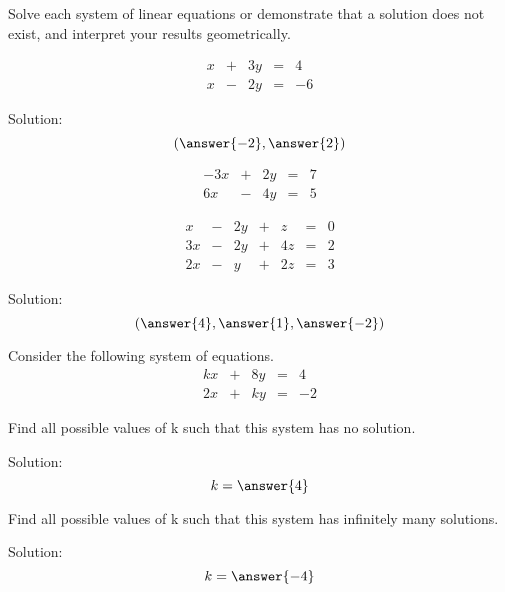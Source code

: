 \documentclass{ximera}
\begin{document}
\begin{problem} 
Solve each system of linear equations or demonstrate that a solution does not exist, and interpret your results geometrically.
  \begin{problem}\label{prob:solvesys1}
  $$\begin{array}{ccccc}
      x & +&3y&= &4 \\
	 x& -&2y&=&-6
    \end{array}$$
    
    Solution: $$(\answer{-2},\answer{2})$$
  \end{problem}
  
  \begin{problem}\label{prob:solvesys2}
  $$\begin{array}{ccccc}
      -3x & +&2y&= &7 \\
	 6x& -&4y&=&5
    \end{array}$$
  \end{problem}
  
  
  \begin{problem}\label{prob:solvesys3}
$$\begin{array}{ccccccc}
      x & -&2y&+&z&= &0 \\
	 3x& -&2y&+&4z&=&2\\
     2x& -&y&+&2z&=&3
    \end{array}$$
    
Solution:    $$(\answer{4},\answer{1},\answer{-2})$$
\end{problem}
\end{problem}

  \begin{problem}
  Consider the following system of equations.
  $$\begin{array}{ccccc}
      kx & +&8y&= &4 \\
	 2x& +&ky&=&-2
    \end{array}$$
     \begin{problem}\label{prob:sysnosolfindk}
Find all possible values of k such that this system has no solution.

Solution: $$k=\answer{4}$$
  \end{problem}
     \begin{problem}\label{prob:sysinfmanysolfindk}
Find all possible values of k such that this system has infinitely many solutions.

Solution: $$k=\answer{-4}$$
  \end{problem}
  \end{problem}
\end{document}
